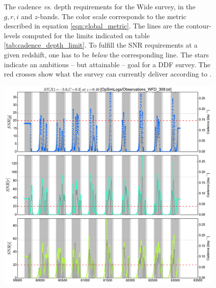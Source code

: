 \documentclass[\docopts]{\docclass}
\begin{document}
\begin{figure}
\begin{center}
\caption{The cadence {\em vs.} depth requirements for the Wide survey,
  in the $g, r, i$ and $z$-bands. The color scale corresponds to the
  metric described in equation \ref{eqn:global_metric}.  The lines are
  the contour-levels computed for the limits indicated on table
  \ref{tab:cadence_depth_limit}. To fulfill the SNR requirements at a
  given redshift, one has to be {\em below} the corresponding
  line. The stars indicate an ambitious -- but attainable -- goal for
  a DDF survey.  The red crosses show what the survey can currently
  deliver according to .}
\label{fig:m5_cadence_limits_wide}
\end{center}
\end{figure}

\begin{figure}[t]
  \begin{center}
    \includegraphics[width=\linewidth]{metric_WFD_309.pdf}
    \caption{}
  \end{center}
\end{figure}
\end{document}
